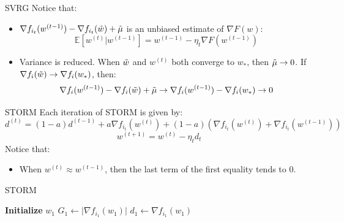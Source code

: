 \documentclass[10pt]{beamer}
\begin{document}
\begin{frame}{SVRG}
    Notice that: 
    \begin{itemize}
        \item $\nabla f_{i_t}(w^{(t-1)}) - \nabla f_{i_t}(\Tilde{w}) + \Tilde{\mu}$ is an unbiased estimate of $\nabla F(w)$:
    $$\mathbb{E}[w^{(t)} | w^{(t-1)}] = w^{(t-1)}-\eta_t \nabla F(w^{(t-1)})$$
        \item Variance is reduced. When $\Tilde{w}$ and $w^{(t)}$ both converge to $w_{\ast}$, then $\Tilde{\mu} \rightarrow 0$. If $\nabla f_i(\Tilde{w}) \rightarrow \nabla f_i(w_{\ast})$, then:
        $$\nabla f_i(w^{(t-1)}) - \nabla f_i(\Tilde{w}) + \Tilde{\mu} \rightarrow \nabla f_i(w^{(t-1)}) - \nabla f_i(w_{\ast}) \rightarrow 0$$
    \end{itemize}
\end{frame}

\begin{frame}{STORM}
    Each iteration of STORM is given by:
    $$d^{(t)} = (1-a)d^{(t-1)} + a\nabla f_{i_t}(w^{(t)}) + (1-a)(\nabla f_{i_t}(w^{(t)}) +  \nabla f_{i_t}(w^{(t-1)}))$$
    $$w^{(t+1)} = w^{(t)} - \eta_t d_t$$
    Notice that:
    \begin{itemize}
        \item When $w^{(t)} \approx w^{(t-1)}$, then the last term of the first equality tends to 0. 
    \end{itemize}
\end{frame}

\begin{frame}{STORM}
    \begin{algorithm}[H]
    \DontPrintSemicolon
    \SetAlgoNoLine

    \textbf{Initialize} $w_1$\;
    $G_1 \gets \mathopen| {\nabla f_{i_1}(w_1)}\mathclose|$\;
    $d_1 \gets \nabla f_{i_1}(w_1)$\;
    \caption{{\textsc{STORM Procedure}}}
    \label{algo:storm}
\end{algorithm}
\end{frame}
\end{document}

